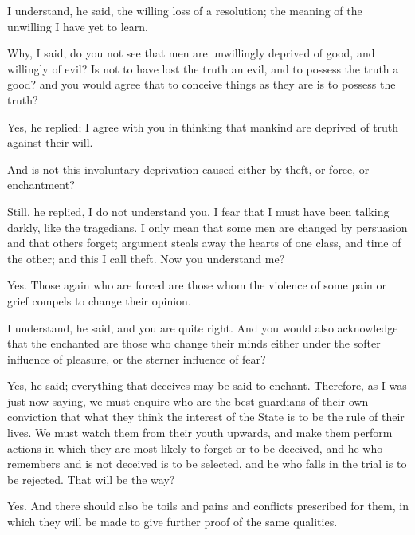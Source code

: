 I understand, he said, the willing loss of a resolution; the meaning of the unwilling I have yet to learn.

Why, I said, do you not see that men are unwillingly deprived of good, and willingly of evil? Is not to have lost the truth an evil, and to possess the truth a good? and you would agree that to conceive things as they are is to possess the truth?

Yes, he replied; I agree with you in thinking that mankind are deprived of truth against their will.

And is not this involuntary deprivation caused either by theft, or force, or enchantment?

Still, he replied, I do not understand you.
I fear that I must have been talking darkly, like the tragedians. I only mean that some men are changed by persuasion and that others forget; argument steals away the hearts of one class, and time of the other; and this I call theft. Now you understand me?

Yes.
Those again who are forced are those whom the violence of some pain or grief compels to change their opinion.

I understand, he said, and you are quite right.
And you would also acknowledge that the enchanted are those who change their minds either under the softer influence of pleasure, or the sterner influence of fear?

Yes, he said; everything that deceives may be said to enchant.
Therefore, as I was just now saying, we must enquire who are the best guardians of their own conviction that what they think the interest of the State is to be the rule of their lives. We must watch them from their youth upwards, and make them perform actions in which they are most likely to forget or to be deceived, and he who remembers and is not deceived is to be selected, and he who falls in the trial is to be rejected. That will be the way?

Yes.
And there should also be toils and pains and conflicts prescribed for them, in which they will be made to give further proof of the same qualities.

